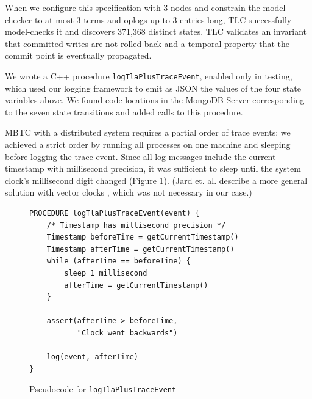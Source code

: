 \documentclass{vldb}
\begin{document}
When we configure this specification with 3 nodes and constrain the model checker to at most 3 terms and oplogs up to 3 entries long, TLC successfully model-checks it and discovers 371,368 distinct states.
TLC validates an invariant that committed writes are not rolled back and a temporal property that the commit point is eventually propagated.

We wrote a C++ procedure \texttt{logTlaPlusTraceEvent}, enabled only in testing, which used our logging framework to emit as JSON the values of the four state variables above.
We found code locations in the MongoDB Server corresponding to the seven state transitions and added calls to this procedure.

MBTC with a distributed system requires a partial order of trace events; we achieved a strict order by running all processes on one machine and sleeping before logging the trace event.
Since all log messages include the current timestamp with millisecond precision, it was sufficient to sleep until the system clock's millisecond digit changed (Figure \ref{fig:millisecond_sleep}). (Jard et. al. describe a more general solution with vector clocks \cite{Jard94GeneralApproachToTraceChecking}, which was not necessary in our case.)

\begin{figure}[b]
\begin{verbatim}
PROCEDURE logTlaPlusTraceEvent(event) {
    /* Timestamp has millisecond precision */
    Timestamp beforeTime = getCurrentTimestamp()
    Timestamp afterTime = getCurrentTimestamp()
    while (afterTime == beforeTime) {
        sleep 1 millisecond
        afterTime = getCurrentTimestamp()
    }

    assert(afterTime > beforeTime,
           "Clock went backwards")

    log(event, afterTime)
}
\end{verbatim}
\caption{Pseudocode for \texttt{logTlaPlusTraceEvent}}
\label{fig:millisecond_sleep}
\end{figure}


\end{document}
